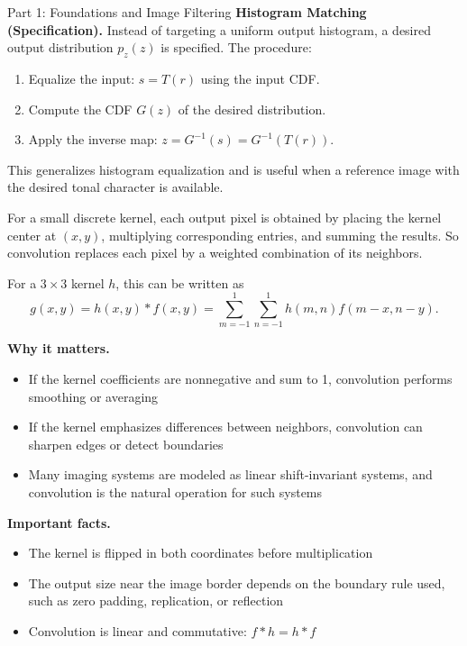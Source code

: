 \documentclass[letterpaper]{article}
\begin{document}
\begin{notes}{Part 1: Foundations and Image Filtering}
\textbf{Histogram Matching (Specification).} Instead of targeting a uniform output histogram, a desired output distribution $p_z(z)$ is specified. The procedure:
\begin{enumerate}
    \item Equalize the input: $s = T(r)$ using the input CDF.
    \item Compute the CDF $G(z)$ of the desired distribution.
    \item Apply the inverse map: $z = G^{-1}(s) = G^{-1}(T(r))$.
\end{enumerate}
This generalizes histogram equalization and is useful when a reference image with the desired tonal character is available.





\columnbreaknofill




For a small discrete kernel, each output pixel is obtained by placing the kernel center at $(x,y)$, multiplying corresponding entries, and summing the results. So convolution replaces each pixel by a weighted combination of its neighbors.

For a $3\times 3$ kernel $h$, this can be written as
$$
g(x,y)= h(x, y) * f(x, y) = \sum_{m=-1}^{1}\sum_{n=-1}^{1} h(m,n)f(m-x,n-y).
$$

\textbf{Why it matters.}
\begin{itemize}
    \item If the kernel coefficients are nonnegative and sum to 1, convolution performs smoothing or averaging
    \item If the kernel emphasizes differences between neighbors, convolution can sharpen edges or detect boundaries
    \item Many imaging systems are modeled as linear shift-invariant systems, and convolution is the natural operation for such systems
\end{itemize}

\textbf{Important facts.}
\begin{itemize}
    \item The kernel is flipped in both coordinates before multiplication
    \item The output size near the image border depends on the boundary rule used, such as zero padding, replication, or reflection
    \item Convolution is linear and commutative: $f*h = h*f$
\end{itemize}


\end{notes}
\end{document}
